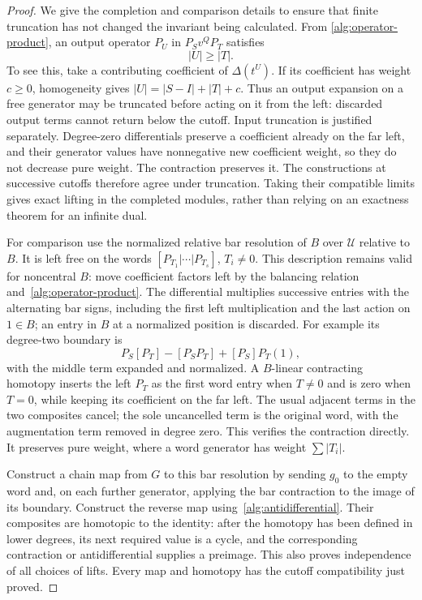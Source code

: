 \begin{proof}
We give the completion and comparison details to ensure that finite
truncation has not changed the invariant being calculated.  From
\eqref{alg:operator-product}, an output operator $P_U$ in
$P_Sv^QP_T$ satisfies
\begin{equation}\label{alg:right-weight-bound}
 |U|\geq |T|.
\end{equation}
To see this, take a contributing coefficient of
$\Delta(t^U)$.  If its coefficient has weight $c\geq0$, homogeneity
gives $|U|=|S-I|+|T|+c$.  Thus an output expansion on a free generator
may be truncated before acting on it from the left: discarded output
terms cannot return below the cutoff.  Input truncation is justified
separately.  Degree-zero differentials preserve a coefficient already
on the far left, and their generator values have nonnegative new
coefficient weight, so they do not decrease pure weight.  The
contraction preserves it.  The constructions at successive cutoffs
therefore agree under truncation.  Taking their compatible limits
gives exact lifting in the completed modules, rather than relying on
an exactness theorem for an infinite dual.

For comparison use the normalized relative bar resolution of $B$ over
$\mathcal U$ relative to $B$.  It is left free on the words
$[P_{T_1}|\cdots|P_{T_s}]$, $T_i\ne0$.  This description remains valid
for noncentral $B$: move coefficient factors left by the balancing
relation and~\eqref{alg:operator-product}.  The differential multiplies
successive entries with the alternating bar signs, including the first
left multiplication and the last action on $1\in B$; an entry in $B$
at a normalized position is discarded.  For example its degree-two
boundary is
\[
 P_S[P_T]-[P_SP_T]+[P_S]P_T(1),
\]
with the middle term expanded and normalized.  A $B$-linear contracting
homotopy inserts the left $P_T$ as the first word entry when $T\ne0$
and is zero when $T=0$, while keeping its coefficient on the far left.
The usual adjacent terms in the two composites cancel; the sole
uncancelled term is the original word, with the augmentation term
removed in degree zero.  This verifies the contraction directly.
It preserves pure weight, where a word generator has weight
$\sum|T_i|$.

Construct a chain map from $G$ to this bar resolution by sending $g_0$
to the empty word and, on each further generator, applying the bar
contraction to the image of its boundary.  Construct the reverse map
using~\eqref{alg:antidifferential}.  Their composites are homotopic to
the identity: after the homotopy has been defined in lower degrees,
its next required value is a cycle, and the corresponding contraction
or antidifferential supplies a preimage.  This also proves independence
of all choices of lifts.  Every map and homotopy has the cutoff
compatibility just proved.


\end{proof}
